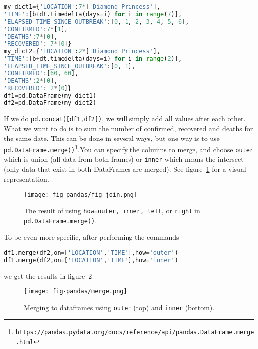 \documentclass[graybox,sectrefs,envcountresetchap,open=right,final]{svmonodo}
\begin{document}
\begin{lstlisting}[language=python,style=blue1bar]
my_dict1={'LOCATION':7*['Diamond Princess'], 
'TIME':[b+dt.timedelta(days=i) for i in range(7)],
'ELAPSED_TIME_SINCE_OUTBREAK':[0, 1, 2, 3, 4, 5, 6],
'CONFIRMED':7*[1],
'DEATHS':7*[0],
'RECOVERED': 7*[0]}
my_dict2={'LOCATION':2*['Diamond Princess'], 
'TIME':[b+dt.timedelta(days=i) for i in range(2)],
'ELAPSED_TIME_SINCE_OUTBREAK':[0, 1],
'CONFIRMED':[60, 60],
'DEATHS':2*[0],
'RECOVERED': 2*[0]}
df1=pd.DataFrame(my_dict1)
df2=pd.DataFrame(my_dict2)

\end{lstlisting}

If we do \texttt{pd.concat([df1,df2])}, we will simply add all values after each other. What we want to do is to sum the number of confirmed, recovered and deaths for the same date. This can be done in several ways, but one way is to use \href{{https://pandas.pydata.org/docs/reference/api/pandas.DataFrame.merge.html}}{\nolinkurl{pd.DataFrame.merge()}\footnote{\texttt{https://pandas.pydata.org/docs/reference/api/pandas.DataFrame.merge.html}}}.You can specify the columns to merge, and choose \texttt{outer} which is union (all data from both frames) or \texttt{inner} which means the intersect (only data that exist in both DataFrames are merged). See figure~\ref{fig:pandas:join} for a visual representation.

\begin{figure}[!ht]  %
  \centerline{\texttt{[image: fig-pandas/fig\_join.png]}}
  \caption{
  The result of using \texttt{how=outer, inner, left}, or \texttt{right} in \texttt{pd.DataFrame.merge()}. \label{fig:pandas:join}
  }
\end{figure}

To be even more specific, after performing the commands



\begin{lstlisting}[language=python,style=blue1bar]
df1.merge(df2,on=['LOCATION','TIME'],how='outer')
df1.merge(df2,on=['LOCATION','TIME'],how='inner')

\end{lstlisting}


we get the results in figure~\ref{fig:pd:merge} 

\begin{figure}[!ht]  %
  \centerline{\texttt{[image: fig-pandas/merge.png]}}
  \caption{
  Merging to dataframes using \texttt{outer} (top) and \texttt{inner} (bottom). \label{fig:pd:merge}
  }
\end{figure}
\end{document}
